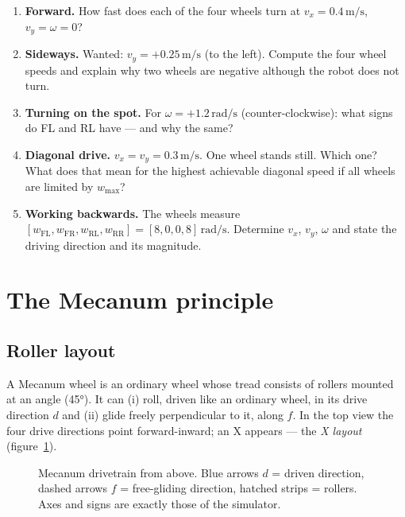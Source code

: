 \documentclass[12pt,a4paper]{scrartcl}
\begin{document}
\begin{enumerate}
  \item \textbf{Forward.} How fast does each of the four wheels turn at
        \(v_x = 0.4\,\mathrm{m/s}\), \(v_y = \omega = 0\)?
  \item \textbf{Sideways.} Wanted: \(v_y = +0.25\,\mathrm{m/s}\) (to the left).
        Compute the four wheel speeds and explain why two wheels
        are negative although the robot does not turn.
  \item \textbf{Turning on the spot.} For \(\omega = +1.2\,\mathrm{rad/s}\)
        (counter-clockwise): what signs do FL and RL have — and why
        the same?
  \item \textbf{Diagonal drive.} \(v_x = v_y = 0.3\,\mathrm{m/s}\). One wheel stands
        still. Which one? What does that mean for the highest achievable
        diagonal speed if all wheels are limited by \(w_{\max}\)?
  \item \textbf{Working backwards.} The wheels measure
        \([w_\text{FL}, w_\text{FR}, w_\text{RL}, w_\text{RR}] =
        [8, 0, 0, 8]\,\mathrm{rad/s}\). Determine \(v_x\), \(v_y\), \(\omega\)
        and state the driving direction and its magnitude.
\end{enumerate}

\section{The Mecanum principle}
\subsection{Roller layout}
A Mecanum wheel is an ordinary wheel whose tread consists of rollers mounted at an
angle (45°). It can (i) roll, driven like an ordinary wheel, in its drive direction
\(d\) and (ii) glide freely perpendicular to it, along \(f\).
In the top view the four drive directions point forward-inward; an X appears —
the \emph{X layout} (figure~\ref{fig:mecanum}).

\begin{figure}[ht]
  \centering
  
  \caption{Mecanum drivetrain from above. Blue arrows \(d\) = driven direction,
    dashed arrows \(f\) = free-gliding direction, hatched strips = rollers. Axes and
    signs are exactly those of the simulator.}
  \label{fig:mecanum}
\end{figure}
\end{document}
